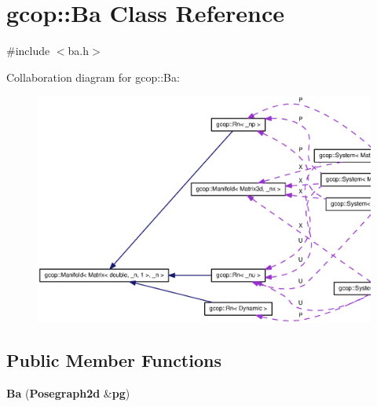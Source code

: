 \section{gcop\-:\-:\-Ba \-Class \-Reference}
\label{classgcop_1_1Ba}


{\ttfamily \#include $<$ba.\-h$>$}



\-Collaboration diagram for gcop\-:\-:\-Ba\-:\nopagebreak
\begin{figure}[H]
\begin{center}
\leavevmode
\includegraphics[width=350pt]{classgcop_1_1Ba__coll__graph}
\end{center}
\end{figure}
\subsection*{\-Public \-Member \-Functions}
\begin{DoxyCompactItemize}
\item 
{\bf \-Ba} ({\bf \-Posegraph2d} \&{\bf pg})
\end{DoxyCompactItemize}

